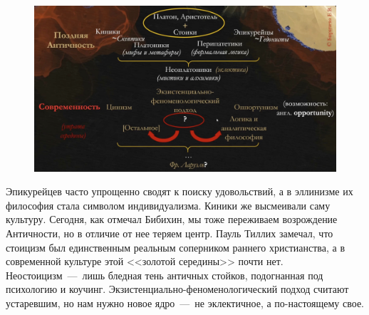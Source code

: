 
\begin{figure}
    \centering
    \includegraphics[width=0.8\linewidth]{pictures/archrev.png}
    \label{fig:archrev}
\end{figure}

Эпикурейцев часто упрощенно сводят к поиску удовольствий, а в эллинизме их философия стала символом индивидуализма. Киники же высмеивали саму культуру. Сегодня, как отмечал Бибихин, мы тоже переживаем возрождение Античности, но в отличие от нее теряем центр. Пауль Тиллих замечал, что стоицизм был единственным реальным соперником раннего христианства, а в современной культуре этой <<золотой середины>> почти нет. Неостоицизм~---~лишь бледная тень античных стойков, подогнанная под психологию и коучинг. Экзистенциально-феноменологический подход считают устаревшим, но нам нужно новое ядро~---~не эклектичное, а по-настоящему свое.

